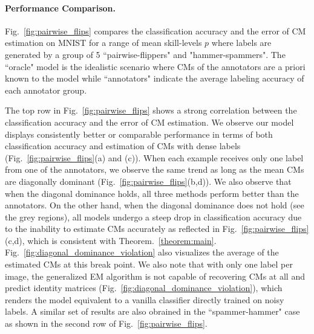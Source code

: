 \paragraph{Performance Comparison.} Fig.~\ref{fig:pairwise_flips} compares the classification accuracy and the error of CM estimation on MNIST for a range of mean skill-levels $p$ where labels are generated by a group of 5 ``pairwise-flippers" and "hammer-spammers". The ``oracle" model is the idealistic scenario where CMs of the annotators are a priori known to the model while ``annotators" indicate the average labeling accuracy of each annotator group.

The top row in Fig.~\ref{fig:pairwise_flips} shows a strong correlation between the classification accuracy and the error of CM estimation. We observe our model displays consistently better or comparable performance in terms of both classification accuracy and estimation of CMs with dense labels (Fig.~\ref{fig:pairwise_flips}(a) and (c)). When each example receives only one label from one of the annotators, we observe the same trend as long as the mean CMs are diagonally dominant (Fig.~\ref{fig:pairwise_flips}(b,d)). We also observe that when the diagonal dominance holds, all three methods perform better than the annotators. On the other hand, when the diagonal dominance does not hold (see the grey regions), all models undergo a steep drop in classification accuracy due to the inability to estimate CMs accurately as reflected in Fig.~\ref{fig:pairwise_flips}(c,d), which is consistent with Theorem.~\ref{theorem:main}. Fig.~\ref{fig:diagonal_dominance_violation} also visualizes the average of the estimated CMs at this break point. We also note that with only one label per image, the generalized EM algorithm  \cite{raykar2009supervised,raykar2010learning} is not capable of recovering CMs at all and predict identity matrices (Fig.~\ref{fig:diagonal_dominance_violation}), which renders the model equivalent to a vanilla classifier directly trained on noisy labels. A similar set of results are also obrained in the ``spammer-hammer" case as shown in the second row of Fig.~\ref{fig:pairwise_flips}. 


